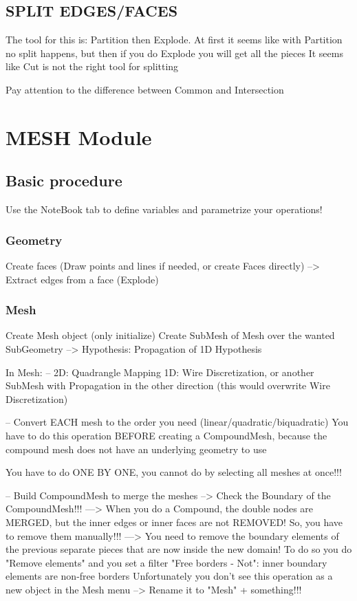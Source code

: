 \documentclass[10pt]{book}
\begin{document}
\section{SPLIT EDGES/FACES}


The tool for this is: Partition then Explode. At first it seems like with Partition no split happens, but then if you do Explode you will get all the pieces
It seems like Cut is not the right tool for splitting

Pay attention to the difference between Common and Intersection

 \chapter{MESH Module}

\section{Basic procedure}

 Use the NoteBook tab to define variables and parametrize your operations!

\subsection{Geometry}


Create faces (Draw points and lines if needed, or create Faces directly)
   --> Extract edges from a face (Explode)
   
\subsection{Mesh}
 
Create Mesh object (only initialize)
Create SubMesh of Mesh over the wanted SubGeometry
   --> Hypothesis: Propagation of 1D Hypothesis

In Mesh:
--   2D: Quadrangle Mapping
   1D: Wire Discretization, or another SubMesh with Propagation in the other direction (this would overwrite Wire Discretization)

-- Convert EACH mesh to the order you need (linear/quadratic/biquadratic)
  You have to do this operation BEFORE creating a CompoundMesh,
  because the compound mesh does not have an underlying geometry to use 
   
  You have to do ONE BY ONE, you cannot do by selecting all meshes at once!!! 
   
-- Build CompoundMesh to merge the meshes
     --> Check the Boundary of the CompoundMesh!!! 
     ---> When you do a Compound, the double nodes are MERGED, but the inner edges or inner faces are not REMOVED! So, you have to remove them manually!!!
     ---> You need to remove the boundary elements of the previous separate pieces that are now inside the new domain!
          To do so you do "Remove elements" and you set a filter "Free borders - Not": inner boundary elements are non-free borders
          Unfortunately you don't see this operation as a new object in the Mesh menu
     --> Rename it to "Mesh" + something!!!
     
\end{document}
